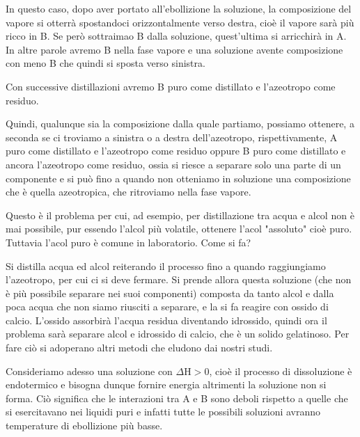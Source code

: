 In questo caso, dopo aver portato all'ebollizione la soluzione, la composizione del vapore si otterrà spostandoci orizzontalmente verso destra, cioè il vapore sarà più ricco in B. Se però sottraimao B dalla soluzione, quest'ultima si arricchirà in A. In altre parole avremo B nella fase vapore e una soluzione avente composizione con meno B che quindi si sposta verso sinistra.

Con successive distillazioni avremo B puro come distillato e l'azeotropo come residuo.

Quindi, qualunque sia la composizione dalla quale partiamo, possiamo ottenere, a seconda se ci troviamo a sinistra o a destra dell'azeotropo, rispettivamente, A puro come distillato e l'azeotropo come residuo oppure B puro come distillato e ancora l'azeotropo come residuo, ossia si riesce a separare solo una parte di un componente e si può fino a quando non otteniamo in soluzione una composizione che è quella azeotropica, che ritroviamo nella fase vapore.

Questo è il problema per cui, ad esempio, per distillazione tra acqua e alcol non è mai possibile, pur essendo l'alcol più volatile, ottenere l'acol "assoluto" cioè puro. Tuttavia l'acol puro è comune in laboratorio. Come si fa?

Si distilla acqua ed alcol reiterando il processo fino a quando raggiungiamo l'azeotropo, per cui ci si deve fermare. Si prende allora questa soluzione (che non è più possibile separare nei suoi componenti) composta da tanto alcol e dalla poca acqua che non siamo riusciti a separare, e la si fa reagire con ossido di calcio. L'ossido assorbirà l'acqua residua diventando idrossido, quindi ora il problema sarà separare alcol e idrossido di calcio, che è un solido gelatinoso. Per fare ciò si adoperano altri metodi che eludono dai nostri studi.

\vspace{0.2cm}Consideriamo adesso una soluzione con $\Delta$H$>$0, cioè il processo di dissoluzione è endotermico e bisogna dunque fornire energia altrimenti la soluzione non si forma. Ciò significa che le interazioni tra A e B sono deboli rispetto a quelle che si esercitavano nei liquidi puri e infatti tutte le possibili soluzioni avranno temperature di ebollizione più basse.

